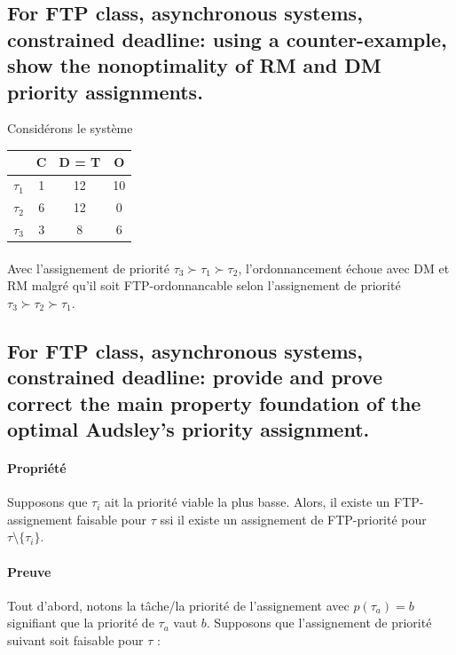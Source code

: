 \subsection{For FTP class, asynchronous systems, constrained deadline: using a counter-example, show the nonoptimality of RM and DM priority assignments.}

Considérons le système 
  \begin{center}
    \begin{tabular}{| l | c | c | c |}
      \hline
                   & C  & D = T  & O  \\
      \hline
       $\tau_{1}$  & 1  & 12     & 10 \\
      \hline
       $\tau_{2}$  & 6  & 12     & 0  \\
      \hline
       $\tau_{3}$  & 3  & 8      & 6  \\
      \hline
  \end{tabular}
  \end{center}
\paragraph{} 
Avec l'assignement de priorité $\tau_{3} \succ \tau_{1} \succ \tau_{2}$, l'ordonnancement échoue avec DM et RM malgré qu'il soit FTP-ordonnancable selon l'assignement de priorité $\tau_{3} \succ \tau_{2} \succ \tau_{1}$.
\subsection{For FTP class, asynchronous systems, constrained deadline: provide and prove correct the main property foundation of the optimal Audsley’s priority assignment.}

\paragraph{Propriété} Supposons que $\tau_{i}$ ait la priorité viable la plus basse. Alors, il existe un FTP-assignement faisable pour $\tau$ ssi il existe un assignement de FTP-priorité pour $\tau \setminus  \{ \tau_{i} \} $.

\paragraph{Preuve} Tout d'abord, notons la tâche/la priorité de l'assignement avec $p(\tau_{a}) = b$ signifiant que la priorité de $\tau_{a}$ vaut $b$. Supposons que l'assignement de priorité suivant soit faisable pour $\tau$ :

